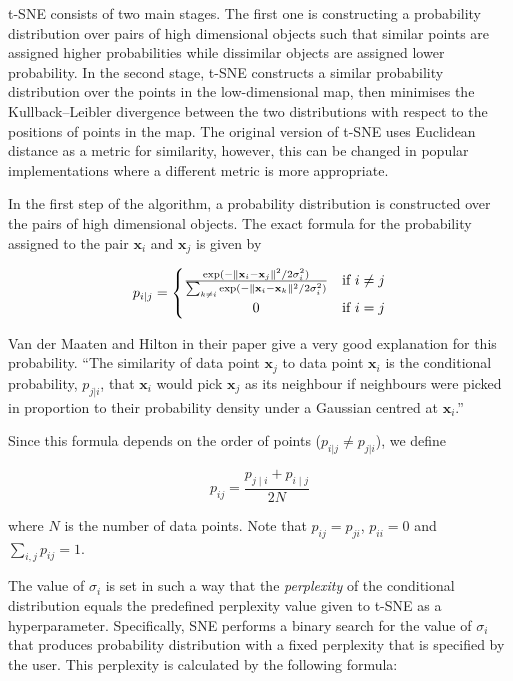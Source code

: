 t-SNE consists of two main stages. The first one is constructing a probability distribution over pairs of high dimensional objects such that similar points are assigned higher probabilities while dissimilar objects are assigned lower probability. In the second stage, t-SNE constructs a similar probability distribution over the points in the low-dimensional map, then minimises the  Kullback–Leibler divergence\cite{bib:kldiv} between the two distributions with respect to the positions of points in the map. The original version of t-SNE uses Euclidean distance as a metric for similarity, however, this can be changed in popular implementations where a different metric is more appropriate.

In the first step of the algorithm, a probability distribution is constructed over the pairs of high dimensional objects. The exact formula for the probability assigned to the pair $\mathbf{x}_i$ and $\mathbf{x}_j$ is given by

\begin{equation}
	\label{eq:tsne:pi|j}
	p_{i|j} =
	\begin{cases}
		{\frac {\exp(-\lVert \mathbf {x} _{i}-\mathbf {x} _{j}\rVert ^{2}/2\sigma _{i}^{2})}{\sum _{k\neq i}\exp(-\lVert \mathbf {x} _{i}-\mathbf {x} _{k}\rVert ^{2}/2\sigma _{i}^{2})}} & \textrm{if } i \neq j \\
		\hfil 0 & \textrm{if } i = j
	\end{cases}
\end{equation}

Van der Maaten and Hilton in their paper\cite{bib:tsne} give a very good explanation for this probability. ``The similarity of data point $\mathbf{x}_j$ to data point $\mathbf{x}_i$ is the conditional probability, $p_{j|i}$, that $\mathbf{x}_i$ would pick $\mathbf{x}_j$ as its neighbour if neighbours were picked in proportion to their probability density under a Gaussian centred at $\mathbf{x}_i$.''

Since this formula depends on the order of points ($p_{i|j} \neq p_{j|i}$), we define

\begin{equation}
	\label{eq:tsne:pij}
	p_{ij}={\frac {p_{j\mid i}+p_{i\mid j}}{2N}}
\end{equation}

where $N$ is the number of data points. Note that $p_{ij} = p_{ji}$, $p_{ii} = 0$ and $\displaystyle\sum_{i, j}p_{ij} = 1$.

The value of $\sigma_{i}$ is set in such a way that the \textit{perplexity} of the conditional distribution equals the predefined perplexity value given to t-SNE as a hyperparameter. Specifically, SNE performs a binary search for the value of $\sigma_{i}$ that produces probability distribution with a fixed perplexity that is specified by the user. This perplexity is calculated by the following formula:

